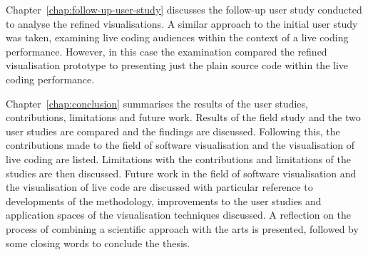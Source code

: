 Chapter~\ref{chap:follow-up-user-study} discusses the follow-up user study conducted to analyse the refined visualisations. A similar approach to the initial user study was taken, examining live coding audiences within the context of a live coding performance. However, in this case the examination compared the refined visualisation prototype to presenting just the plain source code within the live coding performance.

Chapter~\ref{chap:conclusion} summarises the results of the user studies, contributions, limitations and future work. Results of the field study and the two user studies are compared and the findings are discussed. Following this, the contributions made to the field of software visualisation and the visualisation of live coding are listed. Limitations with the contributions and limitations of the studies are then discussed. Future work in the field of software visualisation and the visualisation of live code are discussed with particular reference to developments of the methodology, improvements to the user studies and application spaces of the visualisation techniques discussed. A reflection on the process of combining a scientific approach with the arts is presented, followed by some closing words to conclude the thesis.


